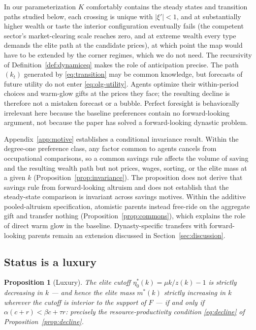 \documentclass[12pt,letterpaper]{article}
\newtheorem{proposition}{Proposition}
\theoremstyle{definition}
\begin{document}
In our parameterization $K$ comfortably contains the steady states and transition paths studied below, each crossing is unique with $|\xi'|<1$, and at substantially higher wealth or taste the interior configuration eventually fails (the competent sector's market-clearing scale reaches zero, and at extreme wealth every type demands the elite path at the candidate prices), at which point the map would have to be extended by the corner regimes, which we do not need.
The recursivity of Definition~\ref{def:dynamiceq} makes the role of anticipation precise.
The path $(k_t)$ generated by \eqref{eq:transition} may be common knowledge, but forecasts of future utility do not enter \eqref{eq:olg-utility}.
Agents optimize their within-period choices and warm-glow gifts at the prices they face; the resulting decline is therefore not a mistaken forecast or a bubble.
Perfect foresight is behaviorally irrelevant here because the baseline preferences contain no forward-looking argument, not because the paper has solved a forward-looking dynastic problem.

Appendix~\ref{app:motive} establishes a conditional invariance result.
Within the degree-one preference class, any factor common to agents cancels from occupational comparisons, so a common savings rule affects the volume of saving and the resulting wealth path but not prices, wages, sorting, or the elite mass at a given $k$ (Proposition~\ref{prop:invariance}).
The proposition does not derive that savings rule from forward-looking altruism and does not establish that the steady-state comparison is invariant across savings motives.
Within the additive pooled-altruism specification, atomistic parents instead free-ride on the aggregate gift and transfer nothing (Proposition~\ref{prop:commons}), which explains the role of direct warm glow in the baseline.
Dynasty-specific transfers with forward-looking parents remain an extension discussed in Section~\ref{sec:discussion}.

\subsection{Status is a luxury}

\begin{proposition}[Luxury]\label{prop:luxury} The elite cutoff $\eta^\ast_0(k)=\mu k/z(k)-1$ is strictly decreasing in $k$ --- and hence the elite mass $m^\ast(k)$ strictly increasing in $k$ wherever the cutoff is interior to the support of $F$ --- if and only if $\alpha(c+r) < \beta c + \tau r$: precisely the resource-productivity condition \eqref{eq:decline} of Proposition~\ref{prop:decline}.
\end{proposition}
\end{document}
